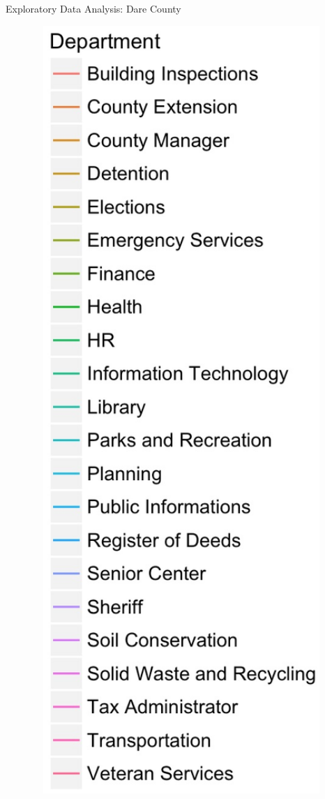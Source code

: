 \documentclass[10pt]{beamer}
\theoremstyle{definition}
\theoremstyle{remark}
\begin{document}
\begin{frame}{Exploratory Data Analysis: Dare County}
\begin{minipage}{0.13\linewidth}
\begin{figure}
	 		 		 	\includegraphics[width=1.25\textwidth]{figures/Dept2.jpg}
	 \end{figure}	
	\end{minipage}
\end{frame}
\end{document}
